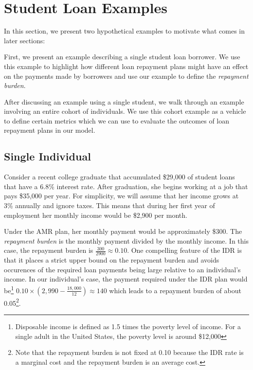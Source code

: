 
\section{Student Loan Examples} \label{sec:example}

In this section, we present two hypothetical examples to motivate what comes in later sections:

First, we present an example describing a single student loan borrower. We use this example to
highlight how different loan repayment plans might have an effect on the payments made by borrowers
and use our example to define the \textit{repayment burden}.

After discussing an example using a single student, we walk through an example involving an entire
cohort of individuals. We use this cohort example as a vehicle to define certain metrics which we
can use to evaluate the outcomes of loan repayment plans in our model.


\subsection{Single Individual}

  Consider a recent college graduate that accumulated \$29,000 of student loans that have a 6.8\%
  interest rate. After graduation, she begins working at a job that pays \$35,000 per year. For
  simplicity, we will assume that her income grows at 3\% annually and ignore taxes. This
  means that during her first year of employment her monthly income would be \$2,900 per month.

  Under the AMR plan, her monthly payment would be approximately \$300. The \textit{repayment
  burden} is the monthly payment divided by the monthly income. In this case, the repayment
  burden is $\frac{300}{2900} \approx 0.10$. One compelling feature of the IDR is that it places a
  strict upper bound on the repayment burden and avoids occurences of the required loan payments
  being large relative to an individual's income. In our individual's case, the payment required
  under the IDR plan would be\footnote{Disposable income is defined as 1.5 times the poverty level
  of income. For a single adult in the United States, the poverty level is around \$12,000} $0.10
  \times (2,990 - \frac{18,000}{12}) \approx 140$ which leads to a repayment burden of about
  0.05\footnote{Note that the repayment burden is not fixed at 0.10 because the IDR rate is a
  marginal cost and the repayment burden is an average cost.}.

